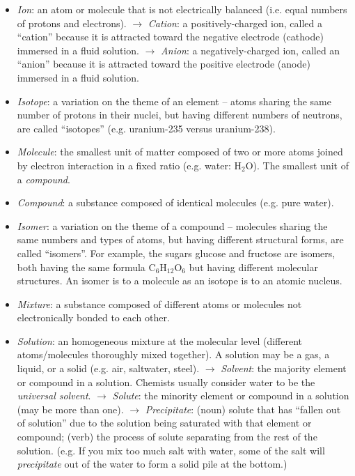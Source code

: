 \begin{itemize}
\item \textit{Ion}: an atom or molecule that is not electrically balanced (i.e. equal numbers of protons and electrons). 
\subitem $\rightarrow$ \textit{Cation}: a positively-charged ion, called a ``cation'' because it is attracted toward the negative electrode (cathode) immersed in a fluid solution.  
\subitem $\rightarrow$ \textit{Anion}: a negatively-charged ion, called an ``anion'' because it is attracted toward the positive electrode (anode) immersed in a fluid solution.  
\item \textit{Isotope}: a variation on the theme of an element -- atoms sharing the same number of protons in their nuclei, but having different numbers of neutrons, are called ``isotopes'' (e.g. uranium-235 versus uranium-238).  
\item \textit{Molecule}: the smallest unit of matter composed of two or more atoms joined by electron interaction in a fixed ratio (e.g. water: H$_{2}$O).  The smallest unit of a \textit{compound}.  
\item \textit{Compound}: a substance composed of identical molecules (e.g. pure water). 
\item \textit{Isomer}: a variation on the theme of a compound -- molecules sharing the same numbers and types of atoms, but having different structural forms, are called ``isomers''.  For example, the sugars glucose and fructose are isomers, both having the same formula C$_{6}$H$_{12}$O$_{6}$ but having different molecular structures.  An isomer is to a molecule as an isotope is to an atomic nucleus.  
\item \textit{Mixture}: a substance composed of different atoms or molecules not electronically bonded to each other. 
\item \textit{Solution}: an homogeneous mixture at the molecular level (different atoms/molecules thoroughly mixed together).  A solution may be a gas, a liquid, or a solid (e.g. air, saltwater, steel).    
\subitem $\rightarrow$ \textit{Solvent}: the majority element or compound in a solution.  Chemists usually consider water to be the \textit{universal solvent}.    
\subitem $\rightarrow$ \textit{Solute}: the minority element or compound in a solution (may be more than one).  
\subitem $\rightarrow$ \textit{Precipitate}: (noun) solute that has ``fallen out of solution'' due to the solution being saturated with that element or compound; (verb) the process of solute separating from the rest of the solution.  (e.g. If you mix too much salt with water, some of the salt will \textit{precipitate} out of the water to form a solid pile at the bottom.)  

\end{itemize}
